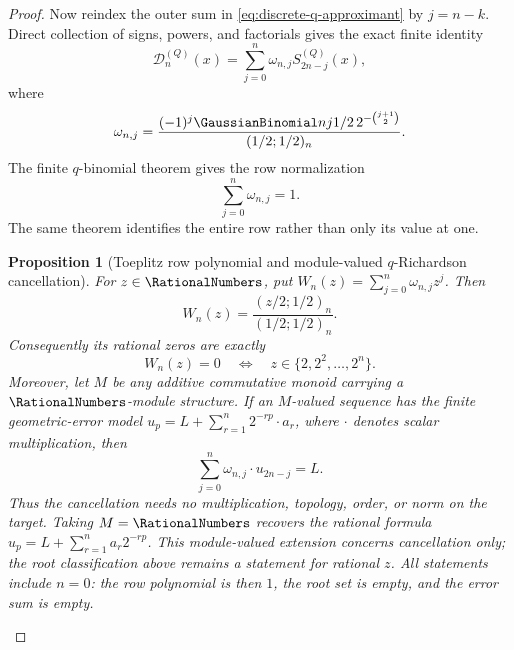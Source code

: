 \documentclass[11pt,oneside]{article}
\newtheorem{proposition}[theorem]{Proposition}
\theoremstyle{definition}
\theoremstyle{remark}
\begin{document}
\begin{proof}
Now reindex the outer sum in \eqref{eq:discrete-q-approximant} by $j=n-k$.  Direct
collection of signs, powers, and factorials gives the exact finite identity
\begin{equation}
 \mathcal D_n^{(Q)}(x)=
 \sum_{j=0}^{n}\omega_{n,j}S_{2n-j}^{(Q)}(x),             \label{eq:discrete-toeplitz-reindex}
\end{equation}
where
\begin{equation}
 \omega_{n,j}=
 \frac{(-1)^j\GaussianBinomial nj{1/2}\,2^{-\binom{j+1}{2}}}
 {(1/2;1/2)_n}.                                          \label{eq:discrete-toeplitz-weight}
\end{equation}
The finite $q$-binomial theorem gives the row normalization
\begin{equation}
 \sum_{j=0}^{n}\omega_{n,j}=1.                            \label{eq:discrete-row-sum}
\end{equation}
The same theorem identifies the entire row rather than only its value at one.

\begin{proposition}[Toeplitz row polynomial and module-valued $q$-Richardson cancellation]
\label{prop:discrete-row-polynomial}
For $z\in\RationalNumbers$, put $W_n(z)=\sum_{j=0}^{n}\omega_{n,j}z^j$.  Then
\begin{equation}
 W_n(z)=\frac{(z/2;1/2)_n}{(1/2;1/2)_n}.                 \label{eq:discrete-row-polynomial}
\end{equation}
Consequently its rational zeros are exactly
\begin{equation}
 W_n(z)=0
 \quad\Longleftrightarrow\quad
 z\in\{2,2^2,\ldots,2^n\}.                              \label{eq:discrete-row-roots}
\end{equation}
Moreover, let $M$ be any additive commutative monoid carrying a $\RationalNumbers$-module
structure.  If an $M$-valued sequence has the finite geometric-error model
$u_p=L+\sum_{r=1}^{n}2^{-rp}\mathbin{\cdot}a_r$, where
$\cdot$ denotes scalar multiplication, then
\begin{equation}
 \sum_{j=0}^{n}\omega_{n,j}\mathbin{\cdot}u_{2n-j}=L.
                                                               \label{eq:discrete-row-richardson}
\end{equation}
Thus the cancellation needs no multiplication, topology, order, or norm on
the target.  Taking $M=\RationalNumbers$ recovers the rational formula
$u_p=L+\sum_{r=1}^{n}a_r2^{-rp}$.  This module-valued extension concerns
cancellation only; the root classification above remains a statement for
rational $z$.  All statements include $n=0$: the row polynomial is then $1$,
the root set is empty, and the error sum is empty.
\end{proposition}


\end{proof}
\end{document}
